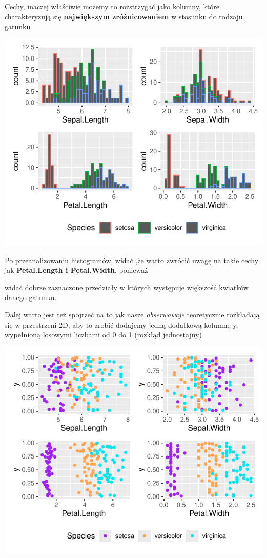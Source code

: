 \documentclass[
  12pt,
]{article}
\begin{document}
Cechy, inaczej właściwie możemy to rozstrzygać jako kolumny, które
charakteryzują się \textbf{największym zróżnicowaniem} w stosunku do
rodzaju gatunku

\begin{center}\includegraphics{Sprawozdanie2_files/figure-latex/zad1b-1} \end{center}

Po przeanalizowaniu histogramów, widać ,że warto zwrócić uwagę na takie
cechy jak \textbf{Petal.Length i Petal.Width}, ponieważ

widać dobrze zaznaczone przedziały w których występuje większość
kwiatków danego gatunku.

Dalej warto jest też spojrzeć na to jak nasze \emph{obserwawcje}
teoretycznie rozkładają się w przestrzeni 2D, aby to zrobić dodajemy
jedną dodatkową kolumnę y, wypełnioną losowymi liczbami od 0 do 1
(rozkłąd jednostajny)

\begin{center}\includegraphics{Sprawozdanie2_files/figure-latex/zad1b1-1} \end{center}
\end{document}
